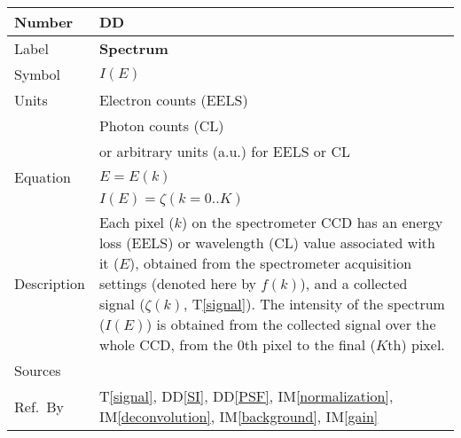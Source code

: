 \documentclass[12pt]{article}
\newcommand{\colAwidth}{0.13\textwidth}
\newcommand{\colBwidth}{0.82\textwidth}
\newcounter{defnum} %
\newcounter{datadefnum} %
\newcommand{\ddref}[1]{DD\ref{#1}}
\newcommand{\tref}[1]{T\ref{#1}}
\newcommand{\iref}[1]{IM\ref{#1}}
\begin{document}
\noindent
\begin{minipage}{\textwidth}
	\renewcommand*{\arraystretch}{1.5}
	\begin{tabular}{| p{\colAwidth} | p{\colBwidth}|}
		\hline
		\rowcolor[gray]{0.9}
		Number& DD{datadefnum}\thedatadefnum \label{Spectrum}\\
		\hline
		Label& \bf Spectrum\\
		\hline
		Symbol & $I(E)$\\
		\hline
		Units & Electron counts (EELS)\\
		& Photon counts (CL)\\
		& or arbitrary units (a.u.) for EELS or CL\\
		  \hline
		  Equation & $E = E(k)$\\
		  & $I(E) = \zeta(k=0..K)$\\
		  \hline
		  Description & Each pixel ($k$) on the spectrometer CCD has an energy loss (EELS) or wavelength (CL) value associated with it ($E$), obtained from the spectrometer acquisition settings (denoted here by $f(k)$), and a collected signal ($\zeta(k)$, \tref{signal}). The intensity of the spectrum ($I(E)$) is obtained from the collected signal over the whole CCD, from the 0th pixel to the final ($K$th) pixel.\\
		  \hline
		  Sources & \cite{egerton_introduction_2011} \\
		  \hline
		  Ref.\ By & \tref{signal}, \ddref{SI}, \ddref{PSF}, \iref{normalization}, \iref{deconvolution}, \iref{background}, \iref{gain}\\
		  \hline
	\end{tabular}
\end{minipage}\\

~\newline
\end{document}
